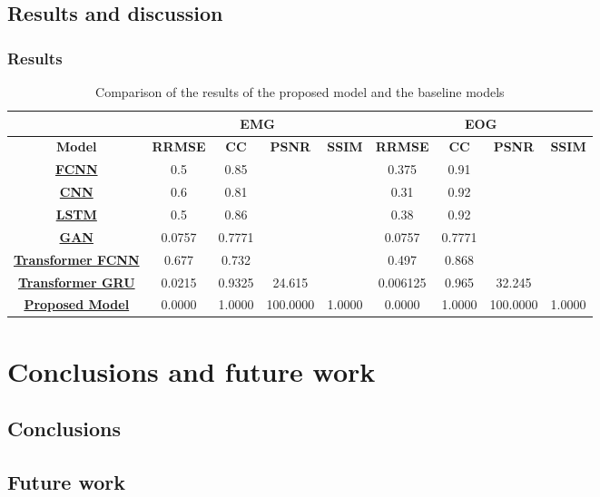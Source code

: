 \documentclass[a4paper]{sapthesis}
\begin{document}
\section{Results and discussion}
\subsection{Results}
\begin{table}[h!]
\centering
\caption{Comparison of the results of the proposed model and the baseline models}
\label{tab:rrmse}
\begin{tabular}{|c|c|c|c|c|c|c|c|c|}
\hline
\multicolumn{1}{|c|}{} & \multicolumn{4}{c|}{\textbf{EMG}} & \multicolumn{4}{c|}{\textbf{EOG}} \\ \cline{2-7}
\hline
\textbf{Model} & \textbf{RRMSE} & \textbf{CC} & \textbf{PSNR} & \textbf{SSIM} & \textbf{RRMSE} & \textbf{CC} & \textbf{PSNR} & \textbf{SSIM} \\ 
\hline
\textbf{\hyperref[sec:model_fcnn]{FCNN}} & 0.5 & 0.85&  &  & 0.375 & 0.91 & &  \\
\hline
\textbf{\hyperref[sec:model_cnn]{CNN}} & 0.6 & 0.81 & & & 0.31 & 0.92 & & \\
\hline
\textbf{\hyperref[sec:model_lstm]{LSTM}} & 0.5 & 0.86 & & & 0.38 &0.92 &  & \\
\hline
\textbf{\hyperref[sec:model_gan]{GAN}} & 0.0757 &  0.7771 & & & 0.0757 & 0.7771  & & \\
\hline
\textbf{\hyperref[sec:model_transformer_fcnn]{Transformer FCNN}} &0.677 & 0.732 & &  & 0.497 & 0.868 &  & \\
\hline
\textbf{\hyperref[sec:model_transformer_gru]{Transformer GRU}} & 0.0215 & 0.9325 & 24.615 &  & 0.006125 & 0.965 & 32.245 &  \\
\hline
\textbf{\hyperref[sec:model_proposed]{Proposed Model}} & 0.0000 & 1.0000 & 100.0000 & 1.0000 & 0.0000 & 1.0000 & 100.0000 & 1.0000 \\
\hline
\end{tabular}
\end{table}

\chapter{Conclusions and future work}
\section{Conclusions}
\section{Future work}
\end{document}
